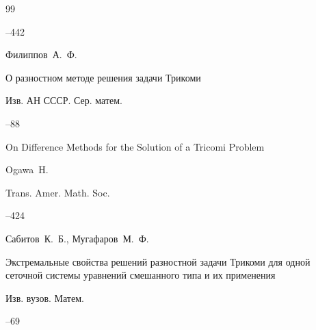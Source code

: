 \begin{thebibliography}{99}

--442






\by Филиппов~А.~Ф.

\paper О разностном методе решения задачи Трикоми

\jour Изв. АН СССР. Сер. матем.




--88







\paper On Difference Methods for the Solution of a Tricomi Problem 

\by Ogawa~H.

\jour Trans. Amer. Math. Soc.




--424





\by Сабитов~К.~Б., Мугафаров~М.~Ф.

\paper Экстремальные свойства решений разностной задачи Трикоми для одной сеточной системы уравнений смешанного типа и их применения

\jour Изв. вузов. Матем.



--69






\end{thebibliography}
